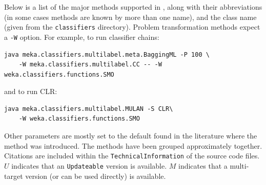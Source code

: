 \documentclass[11pt]{article}
\newcommand{\MEKA}{Meka}
\begin{document}
Below is a list of the major methods supported in \framework{\MEKA}, along with their abbreviations (in some cases methods are known by more than one name), and the class name (given from the \texttt{classifiers} directory). Problem transformation methods expect a \texttt{-W} option. For example, to run classifier chains:
\begin{lstlisting}
java meka.classifiers.multilabel.meta.BaggingML -P 100 \
    -W meka.classifiers.multilabel.CC -- -W weka.classifiers.functions.SMO	
\end{lstlisting}
and to run CLR:
\begin{lstlisting}
java meka.classifiers.multilabel.MULAN -S CLR\
    -W weka.classifiers.functions.SMO	
\end{lstlisting}
Other parameters are mostly set to the default found in the literature where the method was introduced. The methods have been grouped approximately together. Citations are included within the \texttt{TechnicalInformation} of the source code files. $U$ indicates that an \texttt{Updateable} version is available. $M$ indicates that a multi-target version (or can be used directly) is available.\\
\end{document}
